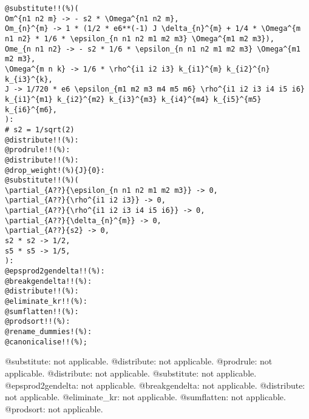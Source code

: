 \documentclass[11pt]{article}
\begin{document}
{\color[named]{Blue}\begin{verbatim}
@substitute!!(%)(
Om^{n1 n2 m} -> - s2 * \Omega^{n1 n2 m},
Om_{n}^{m} -> 1 * (1/2 * e6**(-1) J \delta_{n}^{m} + 1/4 * \Omega^{m n1 n2} * 1/6 * \epsilon_{n n1 n2 m1 m2 m3} \Omega^{m1 m2 m3}),
Ome_{n n1 n2} -> - s2 * 1/6 * \epsilon_{n n1 n2 m1 m2 m3} \Omega^{m1 m2 m3},
\Omega^{m n k} -> 1/6 * \rho^{i1 i2 i3} k_{i1}^{m} k_{i2}^{n} k_{i3}^{k},
J -> 1/720 * e6 \epsilon_{m1 m2 m3 m4 m5 m6} \rho^{i1 i2 i3 i4 i5 i6} k_{i1}^{m1} k_{i2}^{m2} k_{i3}^{m3} k_{i4}^{m4} k_{i5}^{m5} k_{i6}^{m6},
):
# s2 = 1/sqrt(2)
@distribute!!(%):
@prodrule!!(%):
@distribute!!(%):
@drop_weight!(%){J}{0}:
@substitute!!(%)(
\partial_{A??}{\epsilon_{n n1 n2 m1 m2 m3}} -> 0,
\partial_{A??}{\rho^{i1 i2 i3}} -> 0,
\partial_{A??}{\rho^{i1 i2 i3 i4 i5 i6}} -> 0,
\partial_{A??}{\delta_{n}^{m}} -> 0,
\partial_{A??}{s2} -> 0,
s2 * s2 -> 1/2,
s5 * s5 -> 1/5,
):
@epsprod2gendelta!!(%):
@breakgendelta!!(%):
@distribute!!(%):
@eliminate_kr!!(%):
@sumflatten!!(%):
@prodsort!!(%):
@rename_dummies!(%):
@canonicalise!!(%);
\end{verbatim}}
@substitute: not applicable.
@distribute: not applicable.
@prodrule: not applicable.
@distribute: not applicable.
@substitute: not applicable.
@epsprod2gendelta: not applicable.
@breakgendelta: not applicable.
@distribute: not applicable.
@eliminate\_kr: not applicable.
@sumflatten: not applicable.
@prodsort: not applicable.
\end{document}
